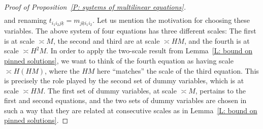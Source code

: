\documentclass[10pt,a4paper]{amsart}
\newcommand{\uk}{{\underline{k}}}
\begin{document}
\begin{proof}[Proof of Proposition~\ref{P: systems of multilinear equations}]
\begin{align*}
\end{align*}
and renaming $t_{i_1 i_2 j\uk} = m_{j\uk i_1 i_2}$.  Let us mention the motivation for choosing these variables.  The above system of four equations has three different scales: The first is at scale $\asymp M$, the second and third are at scale $\asymp HM$, and the fourth is at scale $\asymp H^2 M$.  In order to apply the two-scale result from Lemma~\ref{L: bound on pinned solutions}, we want to think of the fourth equation as having scale $\asymp H(HM)$, where the $HM$ here ``matches'' the scale of the third equation.  This is precisely the role played by the second set of dummy variables, which is at scale $\asymp HM$.  The first set of dummy variables, at scale $\asymp M$, pertains to the first and second equations, and the two sets of dummy variables are chosen in such a way that they are related at consecutive scales as in Lemma~\ref{L: bound on pinned solutions}. 


\end{proof}
\end{document}
